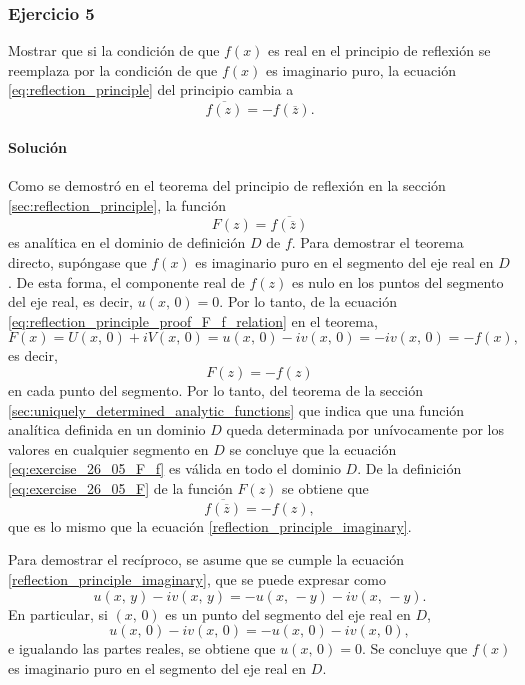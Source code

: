\documentclass[a4paper]{report}
\begin{document}
\subsubsection{Ejercicio 5}

Mostrar que si la condición de que \(f(x)\) es real en el principio de reflexión se reemplaza por la condición de que \(f(x)\) es imaginario puro, la ecuación \ref{eq:reflection_principle} del principio cambia a 
\begin{equation}\label{reflection_principle_imaginary}
 \overline{f(z)}=-f(\overline{z}).
\end{equation}

\paragraph{Solución} Como se demostró en el teorema del principio de reflexión en la sección \ref{sec:reflection_principle}, la función
\begin{equation}\label{eq:exercise_26_05_F}
 F(z)=\overline{f(\overline{z})}
\end{equation}
es analítica en el dominio de definición \(D\) de \(f\). Para demostrar el teorema directo, supóngase que \(f(x)\) es imaginario puro en el segmento del eje real en \(D\). De esta forma, el componente real de \(f(z)\) es nulo en los puntos del segmento del eje real, es decir, \(u(x,\,0)=0\). Por lo tanto, de la ecuación \ref{eq:reflection_principle_proof_F_f_relation} en el teorema,
\[
 F(x)=U(x,\,0)+iV(x,\,0)=u(x,\,0)-iv(x,\,0)=-iv(x,\,0)=-f(x),
\]
es decir,
\begin{equation}\label{eq:exercise_26_05_F_f}
 F(z)=-f(z)
\end{equation}
en cada punto del segmento. Por lo tanto, del teorema de la sección \ref{sec:uniquely_determined_analytic_functions} que indica que una función analítica definida en un dominio \(D\) queda determinada por unívocamente por los valores en cualquier segmento en \(D\) se concluye que la ecuación \ref{eq:exercise_26_05_F_f} es válida en todo el dominio \(D\). De la definición \ref{eq:exercise_26_05_F} de la función \(F(z)\) se obtiene que
\begin{equation}\label{reflection_principle_imaginary_alt}
 \overline{f(\overline{z})}=-f(z), 
\end{equation}
que es lo mismo que la ecuación \ref{reflection_principle_imaginary}.

Para demostrar el recíproco, se asume que se cumple la ecuación \ref{reflection_principle_imaginary}, que se puede expresar como
\[
 u(x,\,y)-iv(x,\,y)=-u(x,\,-y)-iv(x,\,-y).
\]
En particular, si \((x,\,0)\) es un punto del segmento del eje real en \(D\),
\[
 u(x,\,0)-iv(x,\,0)=-u(x,\,0)-iv(x,\,0),
\]
e igualando las partes reales, se obtiene que \(u(x,\,0)=0\). Se concluye que \(f(x)\) es imaginario puro en el segmento del eje real en \(D\).
\end{document}
